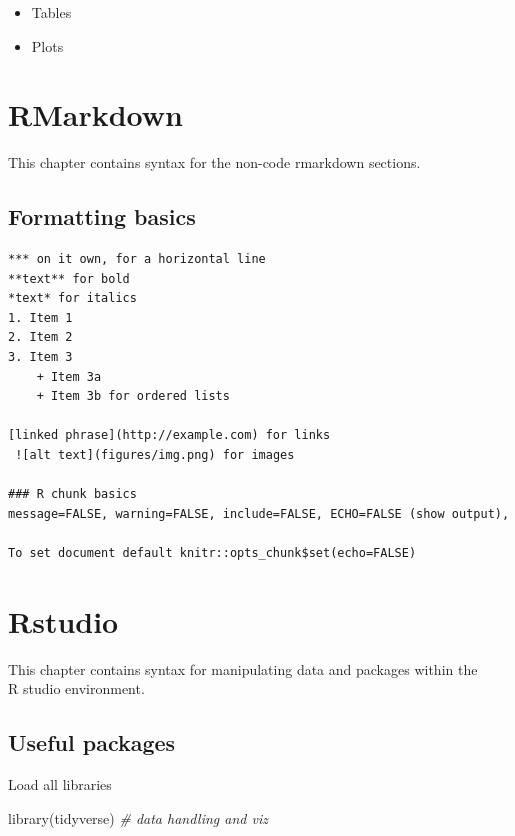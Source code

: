 \documentclass[
]{book}
\newenvironment{Shaded}{\begin{snugshade}}{\end{snugshade}}
\newcommand{\CommentTok}[1]{\textcolor[rgb]{0.56,0.35,0.01}{\textit{#1}}}
\newcommand{\FunctionTok}[1]{\textcolor[rgb]{0.00,0.00,0.00}{#1}}
\newcommand{\NormalTok}[1]{#1}
\providecommand{\tightlist}{%
  \setlength{\itemsep}{0pt}\setlength{\parskip}{0pt}}
\begin{document}
\begin{itemize}
  \begin{itemize}
  \tightlist
  \item
    Tables
  \item
    Plots
  \end{itemize}
\end{itemize}

\hypertarget{rmarkdown}{%
\chapter{RMarkdown}\label{rmarkdown}}

This chapter contains syntax for the non-code rmarkdown sections.

\hypertarget{formatting-basics}{%
\section{Formatting basics}\label{formatting-basics}}

\begin{verbatim}
*** on it own, for a horizontal line
**text** for bold
*text* for italics
1. Item 1
2. Item 2
3. Item 3
    + Item 3a
    + Item 3b for ordered lists
    
[linked phrase](http://example.com) for links
 ![alt text](figures/img.png) for images

### R chunk basics 
message=FALSE, warning=FALSE, include=FALSE, ECHO=FALSE (show output), 

To set document default knitr::opts_chunk$set(echo=FALSE) 
\end{verbatim}

\hypertarget{rstudio}{%
\chapter{Rstudio}\label{rstudio}}

This chapter contains syntax for manipulating data and packages within the\\
R studio environment.

\hypertarget{useful-packages}{%
\section{Useful packages}\label{useful-packages}}

Load all libraries

\begin{Shaded}
\begin{Highlighting}[]
\FunctionTok{library}\NormalTok{(tidyverse) }\CommentTok{\# data handling and viz}
\end{Highlighting}
\end{Shaded}
\end{document}
